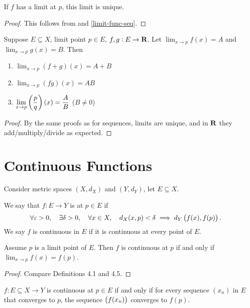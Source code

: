 \begin{corollary}
If $f$ has a limit at $p$, this limit is unique.
\end{corollary}

\begin{proof}
This follows from  and \cref{limit-func-seq}.
\end{proof}

\begin{proposition}
Suppose $E\subseteq X$, limit point $p\in E$, $f,g:E\to\mathbf R$. Let $\displaystyle\lim_{x\to p}f(x)=A$ and $\displaystyle\lim_{x\to p}g(x)=B$. Then
\begin{enumerate}[label=(\roman*)]
\item $\displaystyle\lim_{x\to p}(f+g)(x)=A+B$
\item $\displaystyle\lim_{x\to p}(fg)(x)=AB$
\item $\displaystyle\lim_{x\to p}\left(\frac{p}{q}\right)(x)=\frac{A}{B}$ ($B\neq0$)
\end{enumerate}
\end{proposition}

\begin{proof}
By the same proofs as for sequences, limits are unique, and in $\mathbf R$ they add/multiply/divide as expected.
\end{proof}

\section{Continuous Functions}
Consider metric spaces $(X,d_X)$ and $(Y,d_Y)$, let $E\subseteq X$.

\begin{definition}[Continuity]
We say that $f:E\to Y$ is  at $p\in E$ if 
\[\forall\varepsilon>0,\quad\exists\delta>0,\quad\forall x\in X,\quad d_X(x,p)<\delta\implies d_Y\left(f(x),f(p)\right).\]
We say $f$ is continuous in $E$ if it is continuous at every point of $E$.
\end{definition}

\begin{lemma}
Assume $p$ is a limit point of $E$. Then $f$ is continuous at $p$ if and only if $\displaystyle\lim_{x\to p}f(x)=f(p)$.
\end{lemma}

\begin{proof}
Compare Definitions 4.1 and 4.5.
\end{proof}

\begin{theorem}
$f:E\subseteq X\to Y$ is continuous at $p\in E$ if and only if for every sequence $(x_n)$ in $E$ that converges to $p$, the sequence $\left(f(x_n)\right)$ converges to $f(p)$.
\end{theorem}

